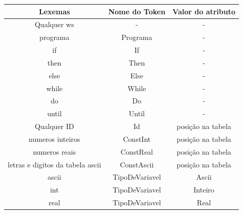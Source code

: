 \documentclass[11pt]{article}
\begin{document}
\begin{table}[H]
    \hspace{-0.7cm}
    \begin{tabular}{c|c|c}
        \hline
        \textbf{Lexemas}   & \textbf{Nome do Token}   & \textbf{Valor do atributo}  \\
        \hline
         Qualquer ws        &        -                 &            -                \\
        \hline
         programa           &        Programa          &            -                \\
        \hline
         if                &        If                &            -                \\
        \hline
         then              &        Then              &            -                \\
        \hline
         else              &        Else              &            -                \\
        \hline
         while             &        While             &            -                \\
        \hline
         do                &        Do                &            -                \\
        \hline
         until             &        Until             &            -                \\
        \hline
        \hline
         Qualquer ID                          &      Id                   &           posição na tabela \\
        \hline
         numeros inteiros                     &      ConstInt             &          posição na tabela  \\
        \hline
         numeros reais                        &      ConstReal            &          posição na tabela  \\
        \hline
         letras e digitos da tabela ascii     &      ConstAscii           &         posição na tabela   \\
        \hline
        \hline
         ascii             &      TipoDeVariavel      &           Ascii                      \\
        \hline
         int               &      TipoDeVariavel      &           Inteiro                    \\
        \hline
         real              &      TipoDeVariavel      &           Real                       \\
        \hline

\end{tabular}
\end{table}
\end{document}
